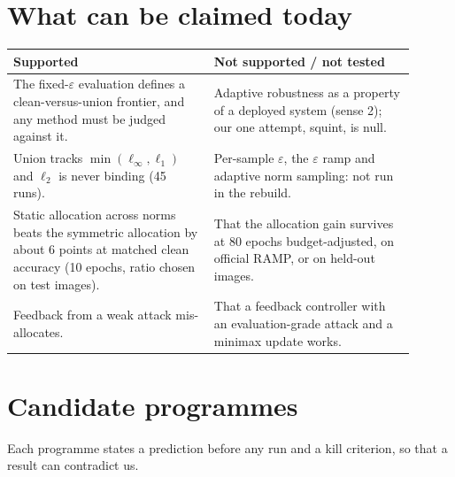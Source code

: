 \documentclass[11pt]{article}
\begin{document}
\section{What can be claimed today}
\begin{table}[h]\centering\small
\begin{tabular}{p{0.45\linewidth}p{0.45\linewidth}}\toprule
Supported & Not supported / not tested\\\midrule
The fixed-$\varepsilon$ evaluation defines a clean-versus-union frontier, and any method must be judged against it. &
Adaptive robustness as a property of a deployed system (sense 2); our one attempt, squint, is null.\\
Union tracks $\min(\ell_\infty,\ell_1)$ and $\ell_2$ is never binding (45 runs). &
Per-sample $\varepsilon$, the $\varepsilon$ ramp and adaptive norm sampling: not run in the rebuild.\\
Static allocation across norms beats the symmetric allocation by about 6 points at matched clean accuracy (10 epochs, ratio chosen on test images). &
That the allocation gain survives at 80 epochs budget-adjusted, on official RAMP, or on held-out images.\\
Feedback from a weak attack mis-allocates. &
That a feedback controller with an evaluation-grade attack and a minimax update works.\\\bottomrule
\end{tabular}
\end{table}
\section{Candidate programmes}
Each programme states a prediction before any run and a kill criterion, so that a result can contradict us.
\end{document}
